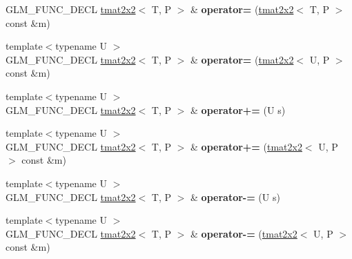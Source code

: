 \begin{DoxyCompactItemize}
\item 
G\+L\+M\+\_\+\+F\+U\+N\+C\+\_\+\+D\+E\+CL \hyperlink{structglm_1_1detail_1_1tmat2x2}{tmat2x2}$<$ T, P $>$ \& {\bfseries operator=} (\hyperlink{structglm_1_1detail_1_1tmat2x2}{tmat2x2}$<$ T, P $>$ const \&m)\hypertarget{structglm_1_1detail_1_1tmat2x2_a614355976a61bf79d7e7ab0e445cd954}{}\label{structglm_1_1detail_1_1tmat2x2_a614355976a61bf79d7e7ab0e445cd954}

\item 
{\footnotesize template$<$typename U $>$ }\\G\+L\+M\+\_\+\+F\+U\+N\+C\+\_\+\+D\+E\+CL \hyperlink{structglm_1_1detail_1_1tmat2x2}{tmat2x2}$<$ T, P $>$ \& {\bfseries operator=} (\hyperlink{structglm_1_1detail_1_1tmat2x2}{tmat2x2}$<$ U, P $>$ const \&m)\hypertarget{structglm_1_1detail_1_1tmat2x2_a7057eb615bb4f04105d614256cdf5ed6}{}\label{structglm_1_1detail_1_1tmat2x2_a7057eb615bb4f04105d614256cdf5ed6}

\item 
{\footnotesize template$<$typename U $>$ }\\G\+L\+M\+\_\+\+F\+U\+N\+C\+\_\+\+D\+E\+CL \hyperlink{structglm_1_1detail_1_1tmat2x2}{tmat2x2}$<$ T, P $>$ \& {\bfseries operator+=} (U s)\hypertarget{structglm_1_1detail_1_1tmat2x2_a30f0b88a14ca516adc8717a0032c04d3}{}\label{structglm_1_1detail_1_1tmat2x2_a30f0b88a14ca516adc8717a0032c04d3}

\item 
{\footnotesize template$<$typename U $>$ }\\G\+L\+M\+\_\+\+F\+U\+N\+C\+\_\+\+D\+E\+CL \hyperlink{structglm_1_1detail_1_1tmat2x2}{tmat2x2}$<$ T, P $>$ \& {\bfseries operator+=} (\hyperlink{structglm_1_1detail_1_1tmat2x2}{tmat2x2}$<$ U, P $>$ const \&m)\hypertarget{structglm_1_1detail_1_1tmat2x2_a05fd709487eecd8e294390304ff43fec}{}\label{structglm_1_1detail_1_1tmat2x2_a05fd709487eecd8e294390304ff43fec}

\item 
{\footnotesize template$<$typename U $>$ }\\G\+L\+M\+\_\+\+F\+U\+N\+C\+\_\+\+D\+E\+CL \hyperlink{structglm_1_1detail_1_1tmat2x2}{tmat2x2}$<$ T, P $>$ \& {\bfseries operator-\/=} (U s)\hypertarget{structglm_1_1detail_1_1tmat2x2_ac7e38a65f69912901f8d82e65ddd04cc}{}\label{structglm_1_1detail_1_1tmat2x2_ac7e38a65f69912901f8d82e65ddd04cc}

\item 
{\footnotesize template$<$typename U $>$ }\\G\+L\+M\+\_\+\+F\+U\+N\+C\+\_\+\+D\+E\+CL \hyperlink{structglm_1_1detail_1_1tmat2x2}{tmat2x2}$<$ T, P $>$ \& {\bfseries operator-\/=} (\hyperlink{structglm_1_1detail_1_1tmat2x2}{tmat2x2}$<$ U, P $>$ const \&m)\hypertarget{structglm_1_1detail_1_1tmat2x2_a37b618643e85ebee82bd95369760ec76}{}\label{structglm_1_1detail_1_1tmat2x2_a37b618643e85ebee82bd95369760ec76}


\end{DoxyCompactItemize}

